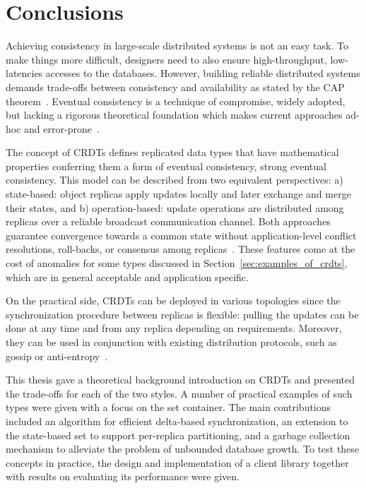 \chapter{Conclusions}
\label{ch:conclusions}

Achieving consistency in large-scale distributed systems is not an easy task. To
make things more difficult, designers need to also ensure high-throughput,
low-latencies accesses to the databases. However, building reliable distributed
systems demands trade-offs between consistency and availability as stated by the
CAP theorem~\cite{Gilbert:2002:BCF:564585.564601}. Eventual consistency is a
technique of compromise, widely adopted, but lacking a rigorous theoretical
foundation which makes current approaches ad-hoc and
error-prone~\cite{DeCandia:2007:DAH:1294261.1294281}.

The concept of CRDTs defines replicated data types that have mathematical
properties conferring them a form of eventual consistency, strong eventual
consistency. This model can be described from two equivalent perspectives:
a) state-based: object replicas apply updates locally and later exchange and
merge their states, and b) operation-based: update operations are distributed
among replicas over a reliable broadcast communication channel. Both approaches
guarantee convergence towards a common state without application-level conflict
resolutions, roll-backs, or consensus among
replicas~\cite{Terry:1995:MUC:224056.224070}. These features come at the cost
of anomalies for some types discussed in Section~\ref{sec:examples_of_crdts},
which are in general acceptable and application specific. 

On the practical side, CRDTs can be deployed in various topologies since the
synchronization procedure between replicas is flexible: pulling the updates can
be done at any time and from any replica depending on requirements. Moreover,
they can be used in conjunction with existing distribution protocols, such as
gossip or anti-entropy~\cite{Demers:1987:EAR:41840.41841,
Petersen:1997:FUP:268998.266711}.

This thesis gave a theoretical background introduction on CRDTs and presented
the trade-offs for each of the two styles. A number of practical examples of
such types were given with a focus on the set container. The main contributions
included an algorithm for efficient delta-based synchronization, an extension to
the state-based set to support per-replica partitioning, and a garbage
collection mechanism to alleviate the problem of unbounded database growth.
To test these concepts in practice, the design and implementation of a client
library together with results on evaluating its performance were given.

